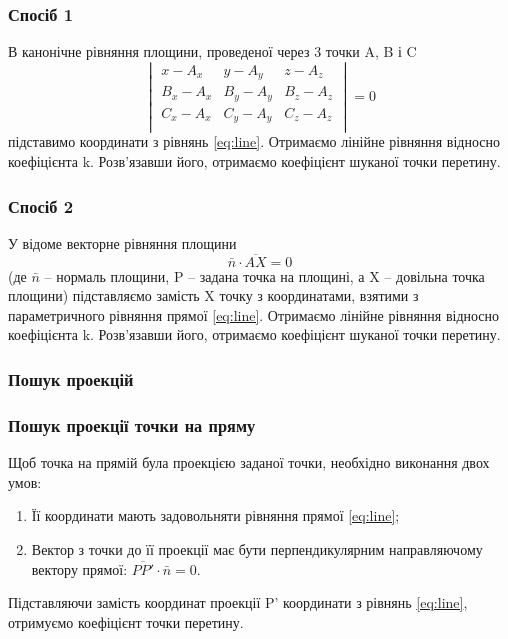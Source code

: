 \documentclass[a4paper,12pt]{article}
\begin{document}
\subsubsection*{Спосіб 1}

В канонічне рівняння площини, проведеної через 3 точки A, B і C
\begin{equation} \label{eq:plane}
  \begin{vmatrix}
    x - A_x & y - A_y & z - A_z \\
    B_x - A_x & B_y - A_y & B_z - A_z \\
    C_x - A_x & C_y - A_y & C_z - A_z \\
  \end{vmatrix} = 0
\end{equation}
підставимо координати з рівнянь \ref{eq:line}. Отримаємо лінійне рівняння відносно коефіцієнта k. Розв’язавши його, отримаємо коефіцієнт шуканої точки перетину.

\subsubsection*{Спосіб 2}

У відоме векторне рівняння площини
\begin{equation} \label{eq:plane-vector}
  \bar n \cdot \overline{AX} = 0
\end{equation}
(де $\bar n$ -- нормаль площини, P -- задана точка на площині, а X -- довільна точка площини) підставляємо замість X точку з координатами, взятими з параметричного рівняння прямої \ref{eq:line}. Отримаємо лінійне рівняння відносно коефіцієнта k. Розв’язавши його, отримаємо коефіцієнт шуканої точки перетину.

\subsubsection{Пошук проекцій} \label{sec:projections}
\subsubsection*{Пошук проекції точки на пряму}

Щоб точка на прямій була проекцією заданої точки, необхідно виконання двох умов:
\begin{enumerate}
  \item Її координати мають задовольняти рівняння прямої \ref{eq:line};
  \item Вектор з точки до її проекції має бути перпендикулярним направляючому вектору прямої: $\overline{PP'} \cdot \bar n = 0$.
\end{enumerate}
Підставляючи замість координат проекції P' координати з рівнянь \ref{eq:line}, отримуємо коефіцієнт точки перетину.
\end{document}

